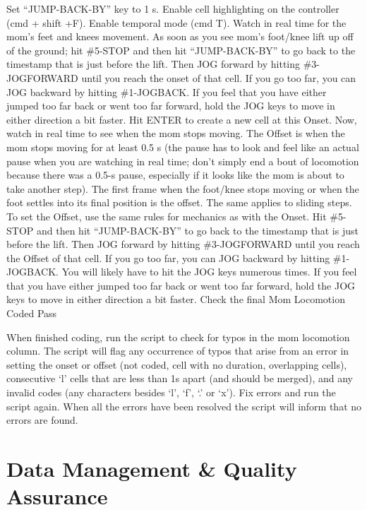 \documentclass[
]{book}
\begin{document}
Set ``JUMP-BACK-BY'' key to 1 s.
Enable cell highlighting on the controller (cmd + shift +F). Enable temporal mode (cmd T).
Watch in real time for the mom's feet and knees movement.
As soon as you see mom's foot/knee lift up off of the ground; hit \#5-STOP and then hit ``JUMP-BACK-BY'' to go back to the timestamp that is just before the lift. Then JOG forward by hitting \#3-JOGFORWARD until you reach the onset of that cell. If you go too far, you can JOG backward by hitting \#1-JOGBACK. If you feel that you have either jumped too far back or went too far forward, hold the JOG keys to move in either direction a bit faster. Hit ENTER to create a new cell at this Onset.
Now, watch in real time to see when the mom stops moving. The Offset is when the mom stops moving for at least 0.5 s (the pause has to look and feel like an actual pause when you are watching in real time; don't simply end a bout of locomotion because there was a 0.5-s pause, especially if it looks like the mom is about to take another step). The first frame when the foot/knee stops moving or when the foot settles into its final position is the offset. The same applies to sliding steps.
To set the Offset, use the same rules for mechanics as with the Onset. Hit \#5-STOP and then hit ``JUMP-BACK-BY'' to go back to the timestamp that is just before the lift. Then JOG forward by hitting \#3-JOGFORWARD until you reach the Offset of that cell. If you go too far, you can JOG backward by hitting \#1-JOGBACK. You will likely have to hit the JOG keys numerous times. If you feel that you have either jumped too far back or went too far forward, hold the JOG keys to move in either direction a bit faster.
Check the final Mom Locomotion Coded Pass

When finished coding, run the script to check for typos in the mom locomotion column. The script will flag any occurrence of typos that arise from an error in setting the onset or offset (not coded, cell with no duration, overlapping cells), consecutive `l' cells that are less than 1s apart (and should be merged), and any invalid codes (any characters besides `l', `f', `.' or `x'). Fix errors and run the script again. When all the errors have been resolved the script will inform that no errors are found.

\hypertarget{part-data-management-quality-assurance}{%
\part{Data Management \& Quality Assurance}\label{part-data-management-quality-assurance}}
\end{document}
